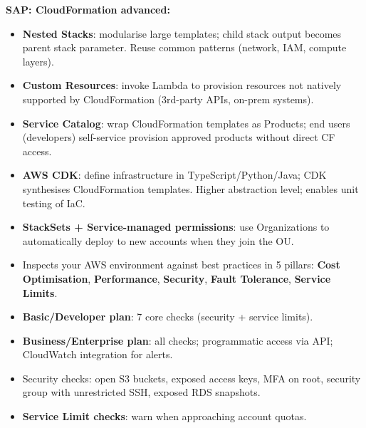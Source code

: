 \begin{sapdepth}
\textbf{SAP: CloudFormation advanced:}
\begin{itemize}
  \item \textbf{Nested Stacks}: modularise large templates; child stack output becomes
        parent stack parameter. Reuse common patterns (network, IAM, compute layers).
  \item \textbf{Custom Resources}: invoke Lambda to provision resources not natively supported
        by CloudFormation (3rd-party APIs, on-prem systems).
  \item \textbf{Service Catalog}: wrap CloudFormation templates as Products; end users
        (developers) self-service provision approved products without direct CF access.
  \item \textbf{AWS CDK}: define infrastructure in TypeScript/Python/Java; CDK synthesises
        CloudFormation templates. Higher abstraction level; enables unit testing of IaC.
  \item \textbf{StackSets + Service-managed permissions}: use Organizations to automatically
        deploy to new accounts when they join the OU.
\end{itemize}
\end{sapdepth}



\begin{keyfacts}
\begin{itemize}
  \item Inspects your AWS environment against best practices in 5 pillars:
        \textbf{Cost Optimisation}, \textbf{Performance}, \textbf{Security},
        \textbf{Fault Tolerance}, \textbf{Service Limits}.
  \item \textbf{Basic/Developer plan}: 7 core checks (security + service limits).
  \item \textbf{Business/Enterprise plan}: all checks; programmatic access via API;
        CloudWatch integration for alerts.
  \item Security checks: open S3 buckets, exposed access keys, MFA on root, security group with
        unrestricted SSH, exposed RDS snapshots.
  \item \textbf{Service Limit checks}: warn when approaching account quotas.
\end{itemize}
\end{keyfacts}
